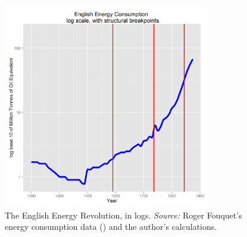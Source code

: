 \documentclass[12pt]{article}
\numberwithin{equation}{section}
\begin{document}
		\begin{figure}[ftb]
		\centering
		\includegraphics[width=0.8\textwidth]{gbpmtoelog.png}
		\caption{The English Energy Revolution, in logs. \textit{Source:} Roger Fouquet's energy consumption data (\citeyear{fouquet_heat_2008}) and the author's calculations.} 
		\label{fig:mtoe_log}
		\end{figure} 		


\listoffigures

\end{document}
